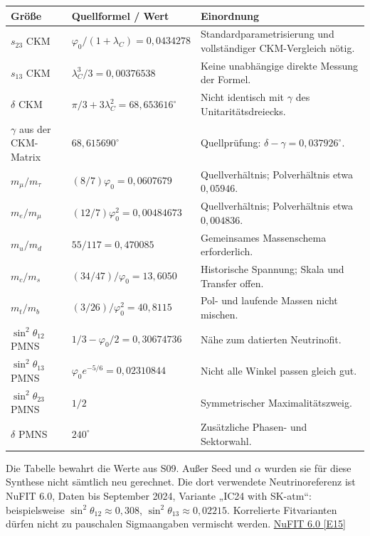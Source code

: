 \begin{longtable}{L{35mm}L{48mm}L{67mm}}
\toprule \textbf{Größe}&\textbf{Quellformel / Wert}&\textbf{Einordnung}\\\midrule\endhead
$s_{23}$ CKM&$\varphi_0/(1+\lambda_C)=0{,}0434278$&Standardparametrisierung und vollständiger CKM-Vergleich nötig.\\
$s_{13}$ CKM&$\lambda_C^3/3=0{,}00376538$&Keine unabhängige direkte Messung der Formel.\\
$\delta$ CKM&$\pi/3+3\lambda_C^2=68{,}653616^\circ$&Nicht identisch mit $\gamma$ des Unitaritätsdreiecks.\\
$\gamma$ aus der CKM-Matrix&$68{,}615690^\circ$&Quellprüfung: $\delta-\gamma=0{,}037926^\circ$.\\
$m_\mu/m_\tau$&$(8/7)\varphi_0=0{,}0607679$&Quellverhältnis; Polverhältnis etwa $0{,}05946$.\\
$m_e/m_\mu$&$(12/7)\varphi_0^2=0{,}00484673$&Quellverhältnis; Polverhältnis etwa $0{,}004836$.\\
$m_u/m_d$&$55/117=0{,}470085$&Gemeinsames Massenschema erforderlich.\\
$m_c/m_s$&$(34/47)/\varphi_0=13{,}6050$&Historische Spannung; Skala und Transfer offen.\\
$m_t/m_b$&$(3/26)/\varphi_0^2=40{,}8115$&Pol- und laufende Massen nicht mischen.\\
$\sin^2\theta_{12}$ PMNS&$1/3-\varphi_0/2=0{,}30674736$&Nähe zum datierten Neutrinofit.\\
$\sin^2\theta_{13}$ PMNS&$\varphi_0e^{-5/6}=0{,}02310844$&Nicht alle Winkel passen gleich gut.\\
$\sin^2\theta_{23}$ PMNS&$1/2$&Symmetrischer Maximalitätszweig.\\
$\delta$ PMNS&$240^\circ$&Zusätzliche Phasen- und Sektorwahl.\\\bottomrule
\end{longtable}
Die Tabelle bewahrt die Werte aus S09. Außer Seed und $\alpha$ wurden sie für diese Synthese nicht sämtlich neu gerechnet. Die dort verwendete Neutrinoreferenz ist NuFIT 6.0, Daten bis September 2024, Variante „IC24 with SK-atm“: beispielsweise $\sin^2\theta_{12}\approx0{,}308$, $\sin^2\theta_{13}\approx0{,}02215$. Korrelierte Fitvarianten dürfen nicht zu pauschalen Sigmaangaben vermischt werden. \href{https://arxiv.org/abs/2410.05380}{NuFIT 6.0 [E15]}

